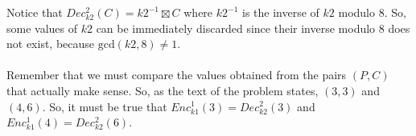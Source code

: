 Notice that $Dec^2_{k2}(C)=k2^{-1}\boxtimes C$ where $k2^{-1}$ is the inverse of $k2$ modulo 8. So, some values of $k2$ can be immediately discarded since their inverse modulo 8 does not exist, because $\text{gcd}(k2,8)\not=1$.\\\\
Remember that we must compare the values obtained from the pairs $(P,C)$ that actually make sense. So, as the text of the problem states, $(3,3)$ and $(4,6)$. So, it must be true that $Enc^1_{k1}(3)=Dec^2_{k2}(3)$ and $Enc^1_{k1}(4)=Dec^2_{k2}(6)$.

